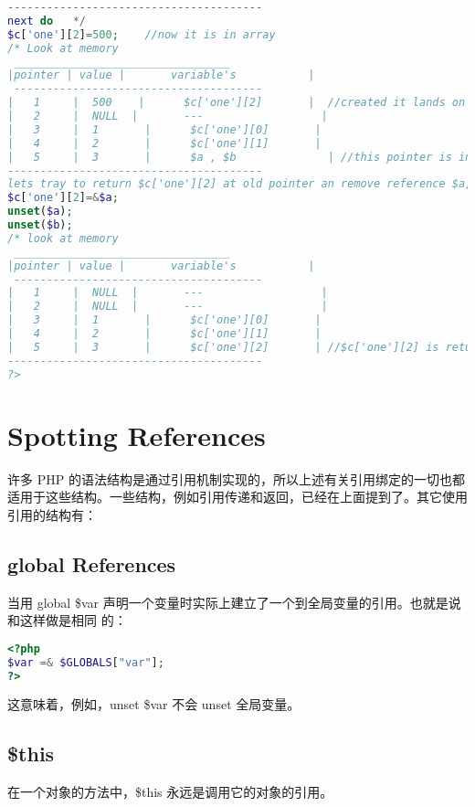 \begin{lstlisting}[language=PHP]
---------------------------------------
next do   */
$c['one'][2]=500;    //now it is in array
/* Look at memory
 _________________________________
|pointer | value |       variable's           |
 --------------------------------------
|   1     |  500    |      $c['one'][2]       |  //created it lands on any(next) free pointer in memory
|   2     |  NULL  |       ---                  |  
|   3     |  1       |      $c['one'][0]       |
|   4     |  2       |      $c['one'][1]       |
|   5     |  3       |      $a , $b              | //this pointer is in use
---------------------------------------
lets tray to return $c['one'][2] at old pointer an remove reference $a,$b.  */
$c['one'][2]=&$a;
unset($a);
unset($b);   
/* look at memory
 _________________________________
|pointer | value |       variable's           |
 --------------------------------------
|   1     |  NULL  |       ---                  |  
|   2     |  NULL  |       ---                  |  
|   3     |  1       |      $c['one'][0]       |
|   4     |  2       |      $c['one'][1]       |
|   5     |  3       |      $c['one'][2]       | //$c['one'][2] is returned, $a,$b is destroyed
--------------------------------------- 
?>
\end{lstlisting}


\chapter{Spotting References}

许多 PHP 的语法结构是通过引用机制实现的，所以上述有关引用绑定的一切也都适用于这些结构。一些结构，例如引用传递和返回，已经在上面提到了。其它使用引用的结构有：

\section{global References}


当用 global \$var 声明一个变量时实际上建立了一个到全局变量的引用。也就是说和这样做是相同
的：

\begin{lstlisting}[language=PHP]
<?php
$var =& $GLOBALS["var"];
?>
\end{lstlisting}

这意味着，例如，unset \$var 不会 unset 全局变量。

\section{\$this}

在一个对象的方法中，\$this 永远是调用它的对象的引用。



















\clearpage